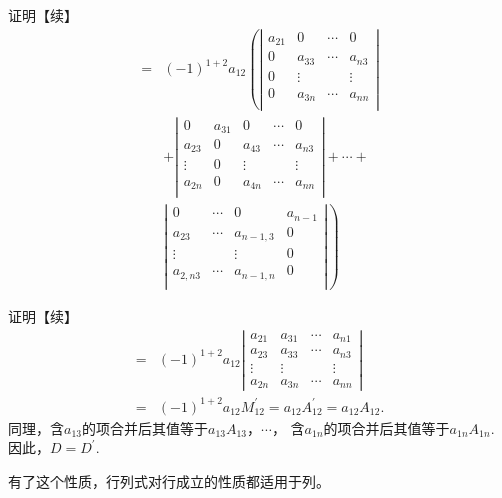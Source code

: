 \begin{frame}
  \begin{block}{证明【续】}
    $$
    \begin{array}{ll}       
      = & (-1)^{1+2} a_{12} \left(      
      \left|
      \begin{array}{cccc}       
        a_{21} & 0 & \cdots & 0 \\
        0 & a_{33} & \cdots & a_{n3} \\
        0 & \vdots  & & \vdots \\
        0 & a_{3n} & \cdots & a_{nn} \\
      \end{array}
      \right|  \right.\\[0.4in]
      & \left.
      + 
      \left|
      \begin{array}{ccccc}
        0 & a_{31} & 0 & \cdots & 0 \\
        a_{23}  & 0 & a_{43} & \cdots & a_{n3} \\
        \vdots & 0 & \vdots & & \vdots \\
        a_{2n}  & 0 & a_{4n} & \cdots & a_{nn} \\
      \end{array}
      \right| + \cdots + \right.\\[0.4in]
      & \left. 
      \left|
      \begin{array}{cccc}
        0 & \cdots & 0 & a_{n-1} \\
        a_{23} & \cdots & a_{n-1,3} & 0 \\
        \vdots & & \vdots & 0\\
        a_{2,n3} & \cdots & a_{n-1,n} & 0 \\
      \end{array}
      \right|
      \right)
    \end{array}
    $$
  \end{block}
\end{frame}




\begin{frame}
  \begin{block}{证明【续】}
    $$
    \begin{array}{ll}      
      = & (-1)^{1+2} a_{12}
      \left|
      \begin{array}{cccc}
        a_{21} & a_{31} & \cdots & a_{n1} \\
        a_{23} & a_{33} & \cdots & a_{n3} \\
        \vdots & \vdots & & \vdots \\
        a_{2n} & a_{3n} & \cdots & a_{nn}        
      \end{array}
      \right| \\[0.3in]
      = & (-1)^{1+2}a_{12} M_{12}^\prime  = a_{12} A_{12}^\prime = a_{12} A_{12}. 
    \end{array}
    $$ \pause 
    同理，含$a_{13}$的项合并后其值等于$a_{13}A_{13}$，$\cdots$，
    含$a_{1n}$的项合并后其值等于$a_{1n}A_{1n}$. 因此，$D=D^\prime$.

  \end{block}
  \pause 
  有了这个性质，行列式对行成立的性质都适用于列。
\end{frame}


